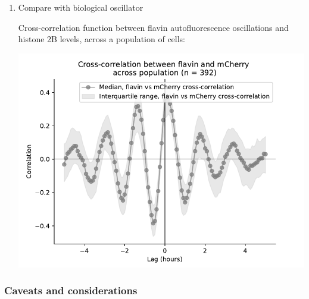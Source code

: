 \begin{enumerate}
\begin{enumerate}
\item Compare with biological oscillator
\label{sec:orgeeca8c5}

Cross-correlation function between flavin autofluorescence oscillations and histone 2B levels, across a population of cells:

\begin{center}
\includegraphics[width=.9\linewidth]{xcf.pdf}
\end{center}
\end{enumerate}
\end{enumerate}

\subsubsection{Caveats and considerations}
\label{sec:analysis-correlation-results-caveats}

